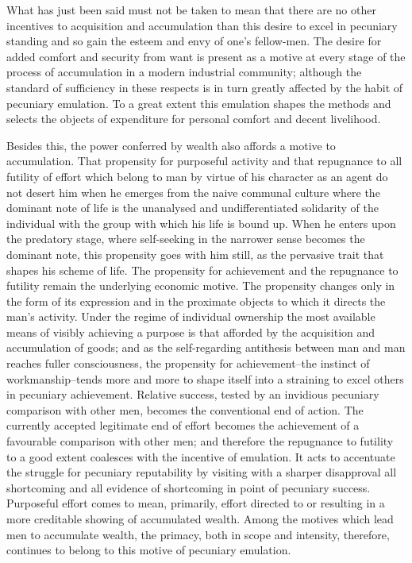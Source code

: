 \documentclass[12pt]{report}
\begin{document}
What has just been said must not be taken to mean that there are no
other incentives to acquisition and accumulation than this desire to
excel in pecuniary standing and so gain the esteem and envy of one's
fellow-men. The desire for added comfort and security from want is
present as a motive at every stage of the process of accumulation in
a modern industrial community; although the standard of sufficiency in
these respects is in turn greatly affected by the habit of pecuniary
emulation. To a great extent this emulation shapes the methods and
selects the objects of expenditure for personal comfort and decent
livelihood.

Besides this, the power conferred by wealth also affords a motive
to accumulation. That propensity for purposeful activity and that
repugnance to all futility of effort which belong to man by virtue of
his character as an agent do not desert him when he emerges from the
naive communal culture where the dominant note of life is the unanalysed
and undifferentiated solidarity of the individual with the group with
which his life is bound up. When he enters upon the predatory stage,
where self-seeking in the narrower sense becomes the dominant note, this
propensity goes with him still, as the pervasive trait that shapes his
scheme of life. The propensity for achievement and the repugnance to
futility remain the underlying economic motive. The propensity changes
only in the form of its expression and in the proximate objects to which
it directs the man's activity. Under the regime of individual ownership
the most available means of visibly achieving a purpose is that afforded
by the acquisition and accumulation of goods; and as the self-regarding
antithesis between man and man reaches fuller consciousness, the
propensity for achievement--the instinct of workmanship--tends more
and more to shape itself into a straining to excel others in pecuniary
achievement. Relative success, tested by an invidious pecuniary
comparison with other men, becomes the conventional end of action. The
currently accepted legitimate end of effort becomes the achievement of
a favourable comparison with other men; and therefore the repugnance to
futility to a good extent coalesces with the incentive of emulation. It
acts to accentuate the struggle for pecuniary reputability by visiting
with a sharper disapproval all shortcoming and all evidence of
shortcoming in point of pecuniary success. Purposeful effort comes to
mean, primarily, effort directed to or resulting in a more creditable
showing of accumulated wealth. Among the motives which lead men to
accumulate wealth, the primacy, both in scope and intensity, therefore,
continues to belong to this motive of pecuniary emulation.
\end{document}
